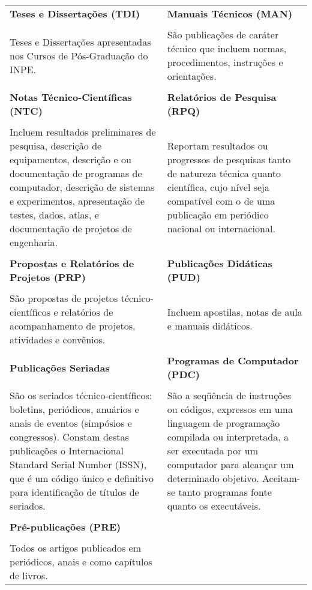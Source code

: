 \begin{table}
\begin{center}
\begin{tabularx}{\textwidth}{X X}
  \textbf{Teses e Dissertações (TDI)}              & \textbf{Manuais Técnicos (MAN)}\\
\\
Teses e Dissertações apresentadas nos Cursos de Pós-Graduação do INPE.	&
São publicações de caráter técnico que incluem normas, procedimentos, instruções e orientações.\\
\\
\textbf{Notas Técnico-Científicas (NTC)}           & \textbf{Relatórios de Pesquisa (RPQ)}\\
\\
Incluem resultados preliminares de pesquisa, descrição de equipamentos, descrição e ou documentação de programas de computador, descrição de sistemas e experimentos, apresentação de testes, dados, atlas, e documentação de projetos de engenharia. 
&	
Reportam resultados ou progressos de pesquisas tanto de natureza técnica quanto científica, cujo nível seja compatível com o de uma publicação em periódico nacional ou internacional.\\
\\
\textbf{Propostas e Relatórios de Projetos (PRP)}	& \textbf{Publicações Didáticas (PUD)} 
\\
\\
São propostas de projetos técnico-científicos e relatórios de acompanhamento de projetos, atividades e convênios.
&	
Incluem apostilas, notas de aula e manuais didáticos. \\
\\         
\textbf{Publicações Seriadas} 	& \textbf{Programas de Computador (PDC)}\\
\\
São os seriados técnico-científicos: boletins, periódicos, anuários e anais de eventos (simpósios e congressos). Constam destas publicações o Internacional Standard Serial Number (ISSN), que é um código único e definitivo para identificação de títulos de seriados. 
&	
São a seqüência de instruções ou códigos, expressos em uma linguagem de programação compilada ou interpretada, a ser executada por um computador para alcançar um determinado objetivo. Aceitam-se tanto programas fonte quanto os executáveis.\\
\\
\textbf{Pré-publicações (PRE)} \\
\\
Todos os artigos publicados em  periódicos, anais e como capítulos de livros. \\                 \end{tabularx}
  \end{center}
 \end{table}


